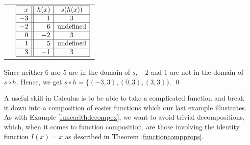 \begin{ex}
\begin{enumerate}
\begin{center}
\begin{tabular}{m{2.5in}m{2.5in}}
& 

$ \begin{array}{|r||r|c|}  \hline

x & h(x) & s(h(x)) \\ \hline

-3 & 1 & 3 \\ \hline

-2 & 6 &  \text{undefined} \\ \hline

0 & -2 & 3 \\ \hline

1 & 5 & \text{undefined} \\ \hline

3 & -1 & 3 \\  \hline


  \end{array} $
  
\\ 

\end{tabular}  
  
  \end{center}
  
Since neither $6$ nor $5$ are in the domain of $s$, $-2$ and $1$ are not in the domain of $s \circ h$.  Hence, we get $s \circ h = \{ (-3,3), (0,3), (3,3) \}$. \qed


\end{enumerate}

\end{ex}



A useful skill in Calculus is to be able to take a complicated function and break it down into a composition of easier functions which our last example illustrates. As with Example \ref{funcarithdecompex}, we want to avoid trivial decompositions, which, when it comes to function composition, are those involving the identity function $I(x) = x$ as described in Theorem \ref{functioncompprops}.


